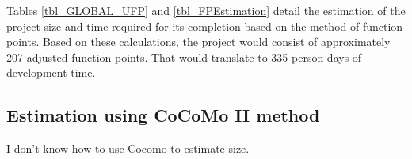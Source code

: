 Tables \ref{tbl_GLOBAL_UFP} and \ref{tbl_FPEstimation} detail the estimation of the project size and time required for its completion based on the method of function points. Based on these calculations, the project would consist of approximately 207 adjusted function points. That would translate to 335 person-days of development time.

\subsection{Estimation using CoCoMo II method}

I don't know how to use Cocomo to estimate size.


